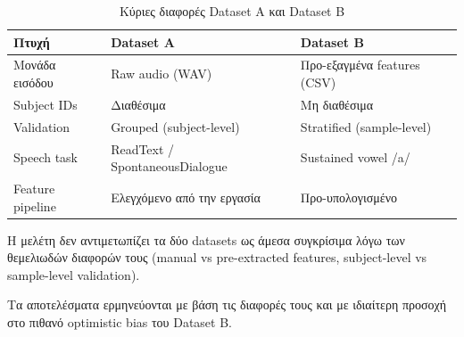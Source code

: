 \begin{table}[H]
\centering
\begin{tabular}{@{}lll@{}}
\toprule
\textbf{Πτυχή} & \textbf{Dataset A} & \textbf{Dataset B} \\
\midrule
Μονάδα εισόδου & Raw audio (WAV) & Προ-εξαγμένα features (CSV) \\
Subject IDs & Διαθέσιμα & Μη διαθέσιμα \\
Validation & Grouped (subject-level) & Stratified (sample-level) \\
Speech task & ReadText / SpontaneousDialogue & Sustained vowel /a/ \\
Feature pipeline & Ελεγχόμενο από την εργασία & Προ-υπολογισμένο \\
\bottomrule
\end{tabular}
\caption{Κύριες διαφορές Dataset A και Dataset B}
\label{tab:cross-dataset-comparison}
\end{table}

Η μελέτη δεν αντιμετωπίζει τα δύο datasets ως άμεσα συγκρίσιμα λόγω των θεμελιωδών διαφορών τους (manual vs pre-extracted features, subject-level vs sample-level validation). 

Τα αποτελέσματα ερμηνεύονται με βάση τις διαφορές τους και με ιδιαίτερη προσοχή στο πιθανό optimistic bias του Dataset B.
